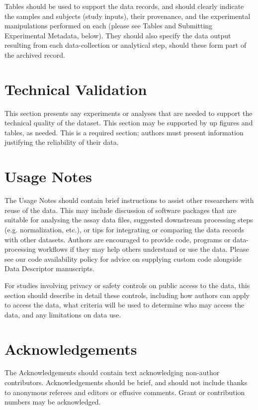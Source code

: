 \documentclass[english]{article}
\begin{document}
Tables should be used to support the data records, and should clearly indicate the samples and subjects (study inputs), their provenance, and the experimental manipulations performed on each (please see Tables and Submitting Experimental Metadata, below). They should also specify the data output resulting from each data-collection or analytical step, should these form part of the archived record.



\section*{Technical Validation}

This section presents any experiments or analyses that are needed
to support the technical quality of the dataset. This section may
be supported by up figures and tables, as needed. This is a required
section; authors must present information justifying the reliability
of their data.


\section*{Usage Notes}

The Usage Notes should contain brief instructions to assist other researchers with reuse of the data. This may include discussion of software packages that are suitable for analysing the assay data files, suggested downstream processing steps (e.g. normalization, etc.), or tips for integrating or comparing the data records with other datasets. Authors are encouraged to provide code, programs or data-processing workflows if they may help others understand or use the data. Please see our code availability policy for advice on supplying custom code alongside Data Descriptor manuscripts.

For studies involving privacy or safety controls on public access to the data, this section should describe in detail these controls, including how authors can apply to access the data, what criteria will be used to determine who may access the data, and any limitations on data use. 



\section*{Acknowledgements}

The Acknowledgements should contain text acknowledging non-author contributors. Acknowledgements should be brief, and should not include thanks to anonymous referees and editors or effusive comments. Grant or contribution numbers may be acknowledged.
\end{document}
